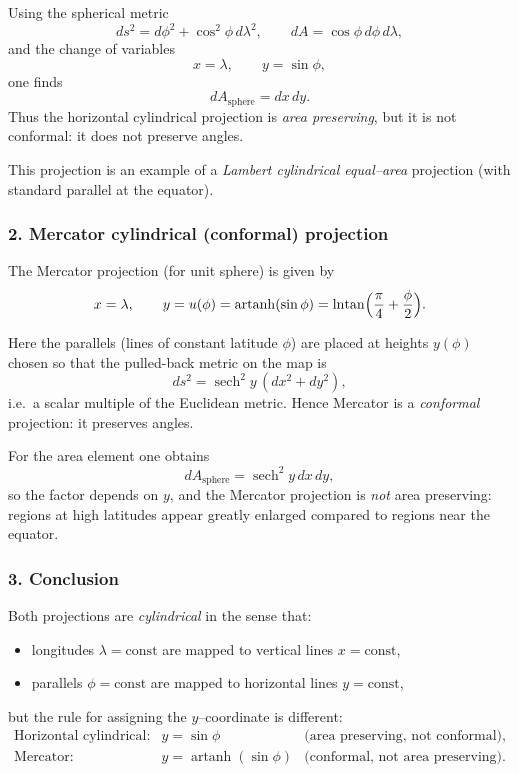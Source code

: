 \documentclass[12pt,a4paper]{article}
\theoremstyle{plain}
\theoremstyle{definition}      %
\begin{document}
Using the spherical metric
\[
ds^{2} = d\phi^{2} + \cos^{2}\phi\,d\lambda^{2},
\qquad
dA = \cos\phi\,d\phi\,d\lambda,
\]
and the change of variables
\[
x = \lambda,\qquad y = \sin\phi,
\]
one finds
\[
dA_{\text{sphere}} = dx\,dy.
\]
Thus the horizontal cylindrical projection is \emph{area preserving}, but it is
not conformal: it does not preserve angles.

This projection is an example of a \emph{Lambert cylindrical equal--area}
projection (with standard parallel at the equator).

\subsubsection*{2. Mercator cylindrical (conformal) projection}

The Mercator projection (for unit sphere) is given by
\[
x = \lambda,\qquad
y = u(\phi) = \operatorname{artanh}(\sin\phi)
= \ln\!\tan\Bigl(\frac{\pi}{4}+\frac{\phi}{2}\Bigr).
\]

Here the parallels (lines of constant latitude $\phi$) are placed at heights
$y(\phi)$ chosen so that the pulled-back metric on the map is
\[
ds^{2} = \operatorname{sech}^{2}y\,(dx^{2}+dy^{2}),
\]
i.e.\ a scalar multiple of the Euclidean metric. Hence Mercator is a
\emph{conformal} projection: it preserves angles.

For the area element one obtains
\[
dA_{\text{sphere}} = \operatorname{sech}^{2}y\,dx\,dy,
\]
so the factor depends on $y$, and the Mercator projection is \emph{not}
area preserving: regions at high latitudes appear greatly enlarged compared
to regions near the equator.

\subsubsection*{3. Conclusion}

Both projections are \emph{cylindrical} in the sense that:
\begin{itemize}
	\item longitudes $\lambda=\text{const}$ are mapped to vertical lines
	$x=\text{const}$,
	\item parallels $\phi=\text{const}$ are mapped to horizontal lines
	$y=\text{const}$,
\end{itemize}
but the rule for assigning the $y$--coordinate is different:
\[
\begin{array}{lll}
	\text{Horizontal cylindrical:} & y = \sin\phi
	& \text{(area preserving, not conformal)},\\[2mm]
	\text{Mercator:} & y = \operatorname{artanh}(\sin\phi)
	& \text{(conformal, not area preserving)}.
\end{array}
\]
\end{document}

